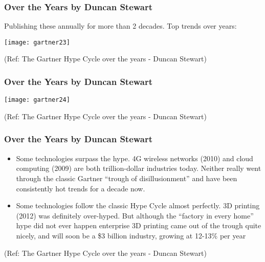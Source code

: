 \begin{frame}[fragile]\frametitle{Over the Years by Duncan Stewart}

Publishing these annually for more than 2 decades. Top trends over years:

\begin{center}
\texttt{[image: gartner23]}
\end{center}


{\tiny (Ref: The Gartner Hype Cycle over the years - Duncan Stewart)}

\end{frame}

\begin{frame}[fragile]\frametitle{Over the Years by Duncan Stewart}

\begin{center}
\texttt{[image: gartner24]}
\end{center}


{\tiny (Ref: The Gartner Hype Cycle over the years - Duncan Stewart)}

\end{frame}

\begin{frame}[fragile]\frametitle{Over the Years by Duncan Stewart}


\begin{itemize}
\item Some technologies surpass the hype. 4G wireless networks (2010) and cloud computing (2009) are both trillion-dollar industries today. Neither really went through the classic Gartner “trough of disillusionment” and have been consistently hot trends for a decade now.

\item Some technologies follow the classic Hype Cycle almost perfectly. 3D printing (2012) was definitely over-hyped. But although the “factory in every home” hype did not ever happen enterprise 3D printing came out of the trough quite nicely, and will soon be a \$3 billion industry, growing at 12-13\% per year

\end{itemize}

{\tiny (Ref: The Gartner Hype Cycle over the years - Duncan Stewart)}


\end{frame}

